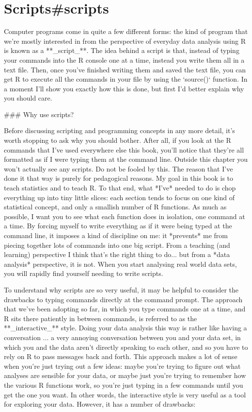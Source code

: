 \section{Scripts{#scripts}}


Computer programs come in quite a few different forms: the kind of program that we're mostly interested in from the perspective of everyday data analysis using R is known as a **_script_**. The idea behind a script is that, instead of typing your commands into the R console one at a time, instead you write them all in a text file. Then, once you've finished writing them and saved the text file, you can get R to execute all the commands in your file by using the `source()` function. In a moment I'll show you exactly how this is done, but first I'd better explain why you should care.


### Why use scripts?

Before discussing scripting and programming concepts in any more detail, it's worth stopping to ask why you should bother. After all, if you look at the R commands that I've used everywhere else this book, you'll notice that they're all formatted as if I were typing them at the command line. Outside this chapter you won't actually see any scripts. Do not be fooled by this. The reason that I've done it that way is purely for pedagogical reasons. My goal in this book is to teach statistics and to teach R. To that end, what *I've* needed to do is chop everything up into tiny little slices: each section tends to focus on one kind of statistical concept, and only a smallish number of R functions. As much as possible, I want you to see what each function does in isolation, one command at a time. By forcing myself to write everything as if it were being typed at the command line, it imposes a kind of discipline on me: it *prevents* me from piecing together lots of commands into one big script. From a teaching (and learning) perspective I think that's the right thing to do... but from a *data analysis* perspective, it is not. When you start analysing real world data sets, you will rapidly find yourself needing to write scripts.


To understand why scripts are so very useful, it may be helpful to consider the drawbacks to typing commands directly at the command prompt. The approach that we've been adopting so far, in which you type commands one at a time, and R sits there patiently in between commands, is referred to as the **_interactive_** style. Doing your data analysis this way is rather like having a conversation ... a very annoying conversation between you and your data set, in which you and the data aren't directly speaking to each other, and so you have to rely on R to pass messages back and forth. This approach makes a lot of sense when you're just trying out a few ideas: maybe you're trying to figure out what analyses are sensible for your data, or maybe just you're trying to remember how the various R functions work, so you're just typing in a few commands until you get the one you want. In other words, the interactive style is very useful as a tool for exploring your data. However, it has a number of drawbacks:

